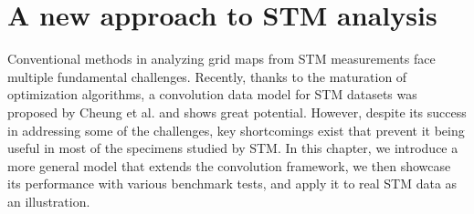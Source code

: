 \chapter{A new approach to STM analysis}
Conventional methods in analyzing grid maps from STM measurements face multiple fundamental  challenges. Recently, thanks to the maturation of optimization algorithms, a convolution data model for STM datasets was proposed by Cheung et al.\cite{cheungDictionaryLearningFouriertransform2020} and shows great potential. However,  despite its success in addressing some of the challenges, key shortcomings exist that prevent it being useful in most of the specimens studied by STM. In this chapter, we introduce a more general model that extends the convolution framework, we then showcase its performance with various benchmark tests, and apply it to real STM data as an illustration.  




\pagebreak




